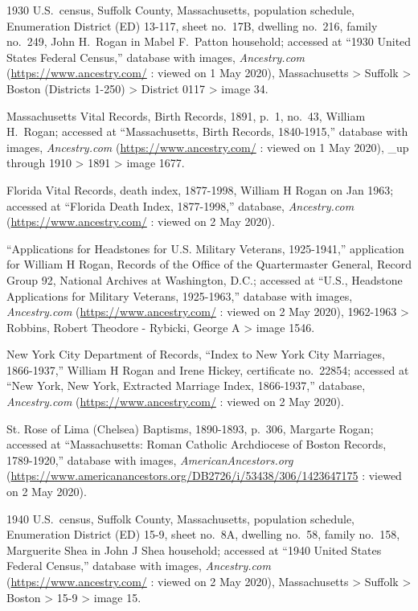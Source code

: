 \begin{thebibliography}{999}
	1930 U.S.\ census, Suffolk County, Massachusetts, population schedule, Enumeration District (ED) 13-117, sheet no.\ 17B, dwelling no.\ 216, family no.\ 249, John H.\ Rogan in Mabel F.\ Patton household; accessed at ``1930 United States Federal Census,'' database with images, \textit{Ancestry.com} (\url{https://www.ancestry.com/} : viewed on 1 May 2020), Massachusetts > Suffolk > Boston (Districts 1-250) > District 0117 > image 34.
	
	Massachusetts Vital Records, Birth Records, 1891, p.\ 1, no.\ 43, William H.\ Rogan; accessed at ``Massachusetts, Birth Records, 1840-1915,'' database with images, \textit{Ancestry.com} (\url{https://www.ancestry.com/} : viewed on 1 May 2020), \_up through 1910 > 1891 > image 1677.
	
	Florida Vital Records, death index, 1877-1998, William H Rogan on Jan 1963; accessed at ``Florida Death Index, 1877-1998,'' database, \textit{Ancestry.com} (\url{https://www.ancestry.com/} : viewed on 2 May 2020).
	
	``Applications for Headstones for U.S. Military Veterans, 1925-1941,'' application for William H Rogan, Records of the Office of the Quartermaster General, Record Group 92, National Archives at Washington, D.C.; accessed at ``U.S., Headstone Applications for Military Veterans, 1925-1963,'' database with images, \textit{Ancestry.com} (\url{https://www.ancestry.com/} : viewed on 2 May 2020), 1962-1963 > Robbins, Robert Theodore - Rybicki, George A > image 1546.
	
	New York City Department of Records, ``Index to New York City Marriages, 1866-1937,'' William H Rogan and Irene Hickey, certificate no.\ 22854; accessed at ``New York, New York, Extracted Marriage Index, 1866-1937,'' database, \textit{Ancestry.com} (\url{https://www.ancestry.com/} : viewed on 2 May 2020).
	
	St. Rose of Lima (Chelsea) Baptisms, 1890-1893, p.\ 306, Margarte Rogan; accessed at ``Massachusetts: Roman Catholic Archdiocese of Boston Records, 1789-1920,'' database with images, \textit{AmericanAncestors.org} (\url{https://www.americanancestors.org/DB2726/i/53438/306/1423647175} : viewed on 2 May 2020).
	
	1940 U.S.\ census, Suffolk County, Massachusetts, population schedule, Enumeration District (ED) 15-9, sheet no.\ 8A, dwelling no.\ 58, family no.\ 158, Marguerite Shea in John J Shea household; accessed at ``1940 United States Federal Census,'' database with images, \textit{Ancestry.com} (\url{https://www.ancestry.com/} : viewed on 2 May 2020), Massachusetts > Suffolk > Boston > 15-9 > image 15.
	

\end{thebibliography}
